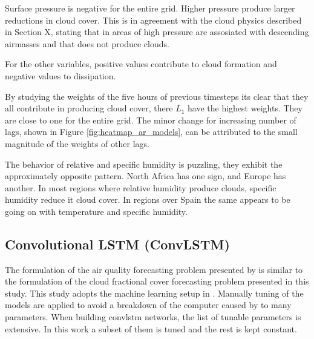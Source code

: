 Surface pressure is negative for the entire grid. Higher pressure produce larger reductions in cloud cover. This is in agreement with the cloud physics described in Section X, stating that in areas of high pressure are assosiated with descending airmasses and that does not produce clouds. 

For the other variables, positive values contribute to cloud formation and negative values to dissipation.

By studying the weights of the five hours of previous timesteps its clear that they all contribute in producing cloud cover, there $L_1$ have the highest weights. They are close to one for the entire grid. The minor change for increasing number of lags, shown in Figure \ref{fig:heatmap_ar_models}, can be attributed to the small magnitude of the weights of other lags. 

The behavior of relative and specific humidity is puzzling, they exhibit the approximately opposite pattern. North Africa has one sign, and Europe has another. In most regions where relative humidity produce clouds, specific humidity reduce it cloud cover. In regions over Spain the same appears to be going on with temperature and specific humidity. 

\clearpage

\subsection{Convolutional LSTM (ConvLSTM)}
The formulation of the air quality forecasting problem presented by \citeauthor{SunAirLSTM} is similar to the formulation of the cloud fractional cover forecasting problem presented in this study. 
This study adopts the machine learning setup in . Manually tuning of the models are applied to avoid a breakdown of the computer caused by to many parameters. When building \acrshort{convlstm} networks, the list of tunable parameters is extensive. In this work a subset of them is tuned and the rest is kept constant.

